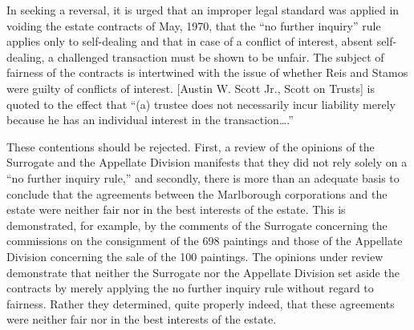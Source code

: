 In seeking a reversal, it is urged that an improper legal standard was applied
in voiding the estate contracts of May, 1970, that the ``no further inquiry''
rule applies only to self-dealing and that in case of a conflict of interest,
absent self-dealing, a challenged transaction must be shown to be unfair. The
subject of fairness of the contracts is intertwined with the issue of whether
Reis and Stamos were guilty of conflicts of interest. [Austin W. Scott Jr., Scott on Trusts] is
quoted to the effect that ``(a) trustee does not necessarily incur liability
merely because he has an individual interest in the transaction\ldots .''

These contentions should be rejected. First, a review of the opinions of the
Surrogate and the Appellate Division manifests that they did not rely solely on
a ``no further inquiry rule,'' and secondly, there is more than an adequate
basis to conclude that the agreements between the Marlborough corporations and
the estate were neither fair nor in the best interests of the estate. This is
demonstrated, for example, by the comments of the Surrogate concerning the
commissions on the consignment of the 698 paintings and those of the Appellate
Division concerning the sale of the 100 paintings. The opinions under review
demonstrate that neither the Surrogate nor the Appellate Division set aside the
contracts by merely applying the no further inquiry rule without regard to
fairness. Rather they determined, quite properly indeed, that these agreements
were neither fair nor in the best interests of the estate.

